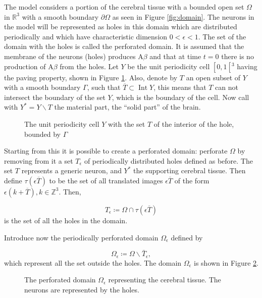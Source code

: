 The model considers a portion of the cerebral tissue with a bounded open set $\Omega$ in $\mathbb{R}^{3}$ with a smooth boundary $\partial \Omega$ as seen in Figure \ref{fig:domain}. The neurons in the model will be represented as holes in this domain which are distributed periodically and which have characteristic dimension $0<\epsilon<1$. The set of the domain with the holes is called the perforated domain.
It is assumed that the membrane of the neurons (holes) produces $\mathrm{A} \beta$ and that at time $t=0$ there is no production of  $\mathrm{A} \beta$ from the holes.
Let $Y$ be the unit periodicity cell $\left[0,1\left[{ }^{3}\right.\right.$ having the paving property, shown in Figure \ref{fig:unit_cell}. 
Also, denote by $T$ an open subset of $Y$ with a smooth boundary $\Gamma$, such that $\overline{T} \subset \operatorname{Int} Y$, this means that $T$ can not intersect the boundary of the set $Y$, which is the boundary of the cell. Now call with $Y^{*}=Y \backslash T$ the material part, the ``solid part'' of the brain. 
\begin{figure}[H]
    \centering
    \caption{The unit periodicity cell $Y$ with the set $T$ of the interior of the hole, bounded by \(\Gamma\)}
    \label{fig:unit_cell}
  \end{figure}

Starting from this it is possible to create a perforated domain: perforate $\Omega$ by removing from it a set $T_{\epsilon}$ of periodically distributed holes defined as before. The set $T$ represents a generic neuron, and $Y^{*}$ the supporting cerebral tissue. Then define $\tau(\epsilon \overline{T})$ to be the set of all translated images $\epsilon \overline{T}$ of the form $\epsilon(k+\overline{T}), k \in \mathbb{Z}^{3}$. Then,

\[ T_{\epsilon} \coloneqq \Omega \cap \tau(\epsilon \overline{T}) \] is the set of all the holes in the domain.

Introduce now the periodically perforated domain $\Omega_{\epsilon}$ defined by

$$
\Omega_{\epsilon} \coloneqq \Omega \backslash \bar{T}_{\epsilon},
$$
which represent all the set outside the holes. The domain $\Omega_{\epsilon}$ is shown in Figure \ref{fig:perforated_domain}.
\begin{figure}[H]
    \centering
    \caption{The perforated domain $\Omega_\epsilon$ representing the cerebral tissue. The neurons are represented by the holes.}
    \label{fig:perforated_domain}
  \end{figure}

